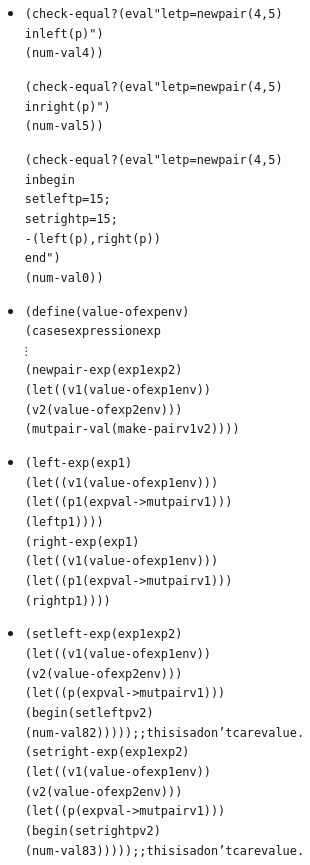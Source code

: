 \documentclass{beamer}
\newcommand{\vdotss}{\(\vdots\)}
\begin{document}
\begin{frame}[fragile]
\begin{scriptsize}
\begin{itemize}
\item<1->
\begin{alltt}
     (check-equal? (eval "let p = newpair(4, 5)
                          in left(p)")
                   (num-val 4))

     (check-equal? (eval "let p = newpair(4, 5)
                          in right(p)")
                   (num-val 5))

     (check-equal? (eval "let p = newpair(4, 5)
                          in begin
                               setleft p = 15;
                               setright p = 15;
                               -(left(p), right(p))
                             end")
                   (num-val 0))
\end{alltt}

\end{itemize}
\end{scriptsize}
\end{frame}

\begin{frame}[fragile]
\begin{scriptsize}
\begin{itemize}
\item<1->
\begin{alltt}
(define (value-of exp env)
  (cases expression exp
       \vdotss{}
    (newpair-exp (exp1 exp2)
      (let ((v1 (value-of exp1 env))
            (v2 (value-of exp2 env)))
        (mutpair-val (make-pair v1 v2))))
\end{alltt}

\item<2->
\begin{alltt}
    (left-exp (exp1)
      (let ((v1 (value-of exp1 env)))
        (let ((p1 (expval->mutpair v1)))
          (left p1))))
    (right-exp (exp1)
      (let ((v1 (value-of exp1 env)))
        (let ((p1 (expval->mutpair v1)))
          (right p1))))
\end{alltt}

\item<3->
\begin{alltt}
    (setleft-exp (exp1 exp2)
      (let ((v1 (value-of exp1 env))
            (v2 (value-of exp2 env)))
        (let ((p (expval->mutpair v1)))
          (begin (setleft p v2)
                 (num-val 82))))) ;; this is a don't care value.
    (setright-exp (exp1 exp2)
      (let ((v1 (value-of exp1 env))
            (v2 (value-of exp2 env)))
        (let ((p (expval->mutpair v1)))
          (begin (setright p v2)
                 (num-val 83))))) ;; this is a don't care value.
\end{alltt}

\end{itemize}
\end{scriptsize}
\end{frame}
\end{document}
